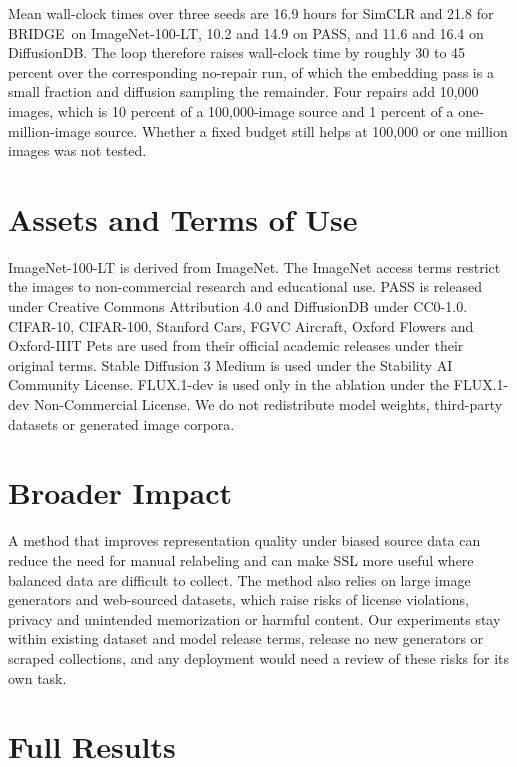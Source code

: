 \documentclass{article}
\newcommand{\method}{BRIDGE}
\begin{document}
Mean wall-clock times over three seeds are 16.9 hours for SimCLR and 21.8 for \method\ on ImageNet-100-LT, 10.2 and 14.9 on PASS, and 11.6 and 16.4 on DiffusionDB. The loop therefore raises wall-clock time by roughly 30 to 45 percent over the corresponding no-repair run, of which the embedding pass is a small fraction and diffusion sampling the remainder. Four repairs add 10{,}000 images, which is 10 percent of a 100{,}000-image source and 1 percent of a one-million-image source. Whether a fixed budget still helps at 100{,}000 or one million images was not tested.

\section{Assets and Terms of Use}
\label{app:assets}
ImageNet-100-LT is derived from ImageNet. The ImageNet access terms restrict the images to non-commercial research and educational use. PASS is released under Creative Commons Attribution 4.0 and DiffusionDB under CC0-1.0. CIFAR-10, CIFAR-100, Stanford Cars, FGVC Aircraft, Oxford Flowers and Oxford-IIIT Pets are used from their official academic releases under their original terms. Stable Diffusion 3 Medium is used under the Stability AI Community License. FLUX.1-dev is used only in the ablation under the FLUX.1-dev Non-Commercial License. We do not redistribute model weights, third-party datasets or generated image corpora.

\section{Broader Impact}
\label{app:impact}
A method that improves representation quality under biased source data can reduce the need for manual relabeling and can make SSL more useful where balanced data are difficult to collect. The method also relies on large image generators and web-sourced datasets, which raise risks of license violations, privacy and unintended memorization or harmful content. Our experiments stay within existing dataset and model release terms, release no new generators or scraped collections, and any deployment would need a review of these risks for its own task.

\section{Full Results}
\label{app:full-results}












\end{document}
